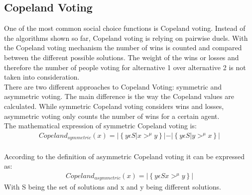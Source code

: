 \documentclass[german, a4paper, 11pt, oneside]{scrbook}
\begin{document}
\subsection{Copeland Voting}
One of the most common social choice functions is Copeland voting.  Instead of the algorithms shown so far, Copeland voting is relying on pairwise duels. With the Copeland voting mechanism the number of wins is counted and compared between the different possible solutions. The weight of the wins or losses and therefore the number of people voting for alternative 1 over alternative 2 is not taken into consideration. \cite{Ek,Brandt}  \\There are two different approaches to Copeland Voting: symmetric and asymmetric voting. The main difference is the way the Copeland values are calculated. While symmetric Copeland voting considers wins and losses, asymmetric voting only counts the number of wins for a certain agent.
\\The mathematical expression of symmetric Copeland voting is: 
\begin{align}
\mathit{Copeland_{symmetric}}(x) = \left| \left\{ y \epsilon S \left| x>^\mu y \right\} \left| - \right| \left\{ y \epsilon S   \right| y>^\mu x   \right\} \right|
\end{align} \cite{Brandt}
\\According to the definition of asymmetric Copeland voting it can be expressed as:
\begin{align}
\mathit{Copeland_{asymmetric}}(x) = \left| \left\{ y \epsilon S  x>^\mu y \right\}  \right|
\end{align}\cite{Brandt}
With S being the set of solutions and x and y being different solutions.
\end{document}
